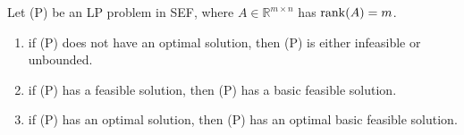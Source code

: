 \begin{thmbox}
    \begin{theorem}
        Let (P) be an LP problem in SEF, where $ A\in \mathbb{R}^{m\times n} $ has $ \operatorname{rank}(A)=m $.
        \begin{enumerate}[label=(\arabic*)]
            \item if (P) does not have an optimal solution, then (P) is either infeasible or unbounded.
            \item if (P) has a feasible solution, then (P) has a basic feasible solution.
            \item if (P) has an optimal solution, then (P) has an optimal basic feasible solution.
        \end{enumerate}
    \end{theorem}
\end{thmbox}

